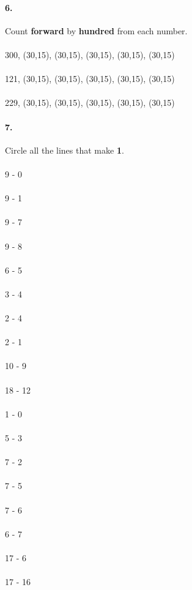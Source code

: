 \documentclass[12pt]{article}
\begin{document}
\bigskip

\paragraph{6.}
Count \textbf{forward} by \textbf{hundred} from each number. \\
\\
300, \framebox(30,15){}, \framebox(30,15){}, \framebox(30,15){}, \framebox(30,15){}, \framebox(30,15){}
\\
\\
121, \framebox(30,15){}, \framebox(30,15){}, \framebox(30,15){}, \framebox(30,15){}, \framebox(30,15){}
\\
\\
229, \framebox(30,15){}, \framebox(30,15){}, \framebox(30,15){}, \framebox(30,15){}, \framebox(30,15){}

\newpage

\paragraph{7.}
Circle all the lines that make \textbf{1}. \\
\\
9 - 0
\\
\\
9 - 1
\\
\\
9 - 7
\\
\\
9 - 8
\\
\\
6 - 5
\\
\\
3 - 4
\\
\\
2 - 4
\\
\\
2 - 1
\\
\\
10 - 9 
\\
\\
18 - 12
\\
\\
1 - 0
\\
\\
5 - 3 
\\
\\
7 - 2
\\
\\
7 - 5
\\
\\
7 - 6
\\
\\
6 - 7
\\
\\
17 - 6
\\
\\
17 - 16
\end{document}

